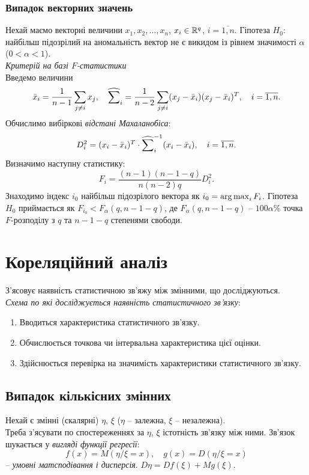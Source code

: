 \subsubsection{Випадок векторних значень}
Нехай маємо векторні величини $x_1, x_2, \ldots, x_n$, $x_i \in \mathbb{R}^q$, $i = \overline{1, n}$. Гіпотеза $H_0$: найбільш підозрілий на аномальність вектор не є викидом із рівнем значимості $\alpha$ ($0 < \alpha < 1$). \\

\textit{Критерій на базі $F$-статистики} \\

Введемо величини \[\bar{x}_i = \dfrac{1}{n - 1} \displaystyle\sum\limits_{j \ne i} x_j, \quad \widehat{\displaystyle\sum\limits}_i = \dfrac{1}{n - 2} \displaystyle\sum\limits_{j \ne i} (x_j - \bar{x}_i) (x_j - \bar{x}_i)^T, \quad i = \overline{1,n}.\]
Обчислимо вибіркові \textit{відстані Махаланобіса}: \[ D_i^2 = (x_i - \bar{x}_i)^T \cdot \widehat{\displaystyle\sum\limits}_i^{-1} (x_i - \bar{x}_i), \quad i = \overline{1, n}. \] Визначимо наступну статистику: \[ F_i = \dfrac{(n - 1)(n - 1 - q)}{n(n - 2)q} D_i^2. \] Знаходимо індекс $i_0$ найбільш підозрілого вектора як $i_0 = \operatorname*{arg\,max}_i F_i$. Гіпотеза $H_0$ приймається як $F_{i_0} < F_\alpha(q, n - 1 - q)$, де $F_\alpha(q, n - 1 - q)$ -- $100\alpha\%$ точка $F$-розподілу з $q$ та $n - 1 - q$ степенями свободи.
\section{Кореляційний аналіз}
З'ясовує наявність статистичною зв'яжу між змінними, що досліджуються. \\

\textit{Схема по які досліджується наявність статистичного зв'язку}:
\begin{enumerate}
	\item Вводиться характеристика статистичного зв'язку.
	\item Обчислюється точкова чи інтервальна характеристика цієї оцінки.
	\item Здійснюється перевірка на значимість характеристики статистичного зв'язку.
\end{enumerate}
\subsection{Випадок кількісних змінних}
Нехай є змінні (скалярні) $\eta$, $\xi$ ($\eta$ -- залежна, $\xi$ -- незалежна). \\

Треба з'ясувати по спостереженнях за $\eta$, $\xi$ істотність зв'язку між ними. Зв'язок шукається у \textit{вигляді функції регресії}: \[ f(x) = M(\eta / \xi = x), \quad g(x) = D(\eta / \xi = x) \] -- \textit{умовні матсподівання і дисперсія}. $D\eta = Df(\xi)+ Mg(\xi)$. \\

